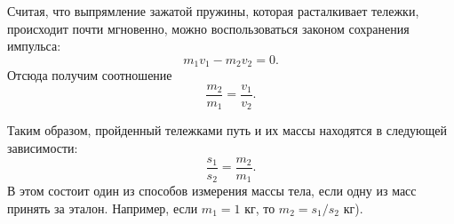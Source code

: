 \documentclass[All.tex]{subfiles}
\begin{document}
Считая, что выпрямление зажатой пружины, которая расталкивает тележки, происходит почти мгновенно, можно воспользоваться законом сохранения импульса:
\begin{equation}\label{newton-eq4}
m_{1}v_{1} - m_{2}v_{2} = 0.
\end{equation}
Отсюда получим соотношение
\begin{equation}\label{newton-eq5}
\frac{m_{2}}{m_{1}} = \frac{v_{1}}{v_{2}}.
\end{equation}

Таким образом, пройденный тележками путь и их массы находятся в следующей зависимости:
\begin{equation}\label{newton-eq6}
\frac{s_{1}}{s_{2}} = \frac{m_{2}}{m_{1}}.
\end{equation}
В этом состоит один из способов измерения массы тела, если одну из масс принять за эталон.
Например, если $m_{1}=1$ кг, то $m_{2}=s_1/s_2$ кг).
\end{document}
